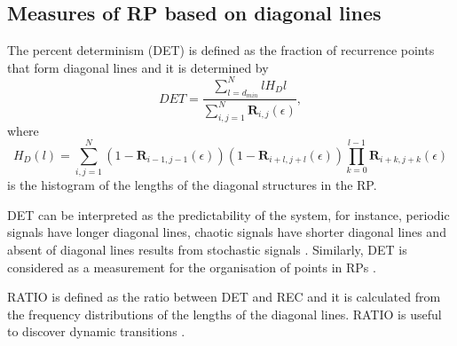 \subsection{Measures of RP based on diagonal lines}
The percent determinism (DET) is defined as the fraction of recurrence points
that form diagonal lines and it is determined by
\begin{equation}
	DET=\frac{\sum^{N}_{l=d_{min}} l H_D{l} }{\sum^{N}_{i,j=1} 
	\mathbf{R}_{i,j}(\epsilon) },
\end{equation}
where 
\begin{equation}
	H_D(l) = \sum^{N}_{i,j=1} (1- \mathbf{R}_{i-1,j-1}(\epsilon) ) 
		(1- \mathbf{R}_{i+l,j+l}(\epsilon) ) 
		\prod^{l-1}_{k=0}  \mathbf{R}_{i+k,j+k}(\epsilon)
\end{equation}
is the histogram of the lengths of the diagonal structures in the RP.

DET can be interpreted as the predictability of the system,
for instance,  periodic signals have longer diagonal lines, 
chaotic signals have shorter diagonal lines and 
absent of diagonal lines results from stochastic 
signals \citep{marwan2007, marwan2015}. 
Similarly, DET is considered as a measurement for 
the organisation of points in RPs \citep{iwanski1998}. 

RATIO is defined as the ratio between DET and REC and it is calculated from 
the frequency distributions of the lengths of the diagonal lines.
RATIO is useful to discover dynamic transitions \citep{marwan2015}.
% 
%
%

